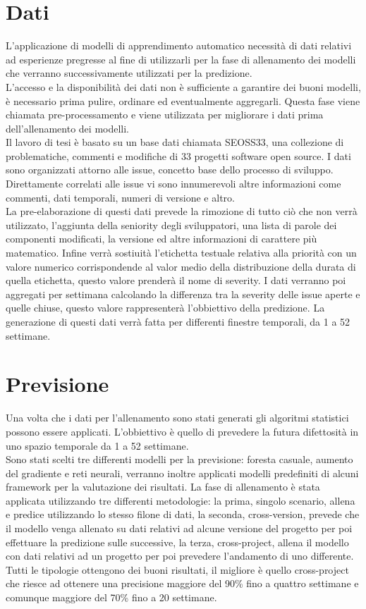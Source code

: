 \documentclass{article}
\begin{document}
\section{Dati}
L'applicazione di modelli di apprendimento automatico necessità di dati relativi ad esperienze pregresse al fine di utilizzarli per la fase di allenamento dei modelli che verranno successivamente utilizzati per la predizione.\\
L'accesso e la disponibilità dei dati non è sufficiente a garantire dei buoni modelli, è necessario prima pulire, ordinare ed eventualmente aggregarli. Questa fase viene chiamata pre-processamento e viene utilizzata per migliorare i dati prima dell'allenamento dei modelli.\\
Il lavoro di tesi è basato su un base dati chiamata SEOSS33, una collezione di problematiche, commenti e modifiche di 33 progetti software open source. I dati sono organizzati attorno alle issue, concetto base dello processo di sviluppo. Direttamente correlati alle issue vi sono innumerevoli altre informazioni come commenti, dati temporali, numeri di versione e altro.\\
La pre-elaborazione di questi dati prevede la rimozione di tutto ciò che non verrà utilizzato, l'aggiunta della seniority degli sviluppatori, una lista di parole dei componenti modificati, la versione ed altre informazioni di carattere più matematico. Infine verrà sostiuità l'etichetta testuale relativa alla priorità con un valore numerico corrispondende al valor medio della distribuzione della durata di quella etichetta, questo valore prenderà il nome di severity. I dati verranno poi aggregati per settimana calcolando la differenza tra la severity delle issue aperte e quelle chiuse, questo valore rappresenterà l'obbiettivo della predizione. La generazione di questi dati verrà fatta per differenti finestre temporali, da 1 a 52 settimane.

\section{Previsione}
Una volta che i dati per l'allenamento sono stati generati gli algoritmi statistici possono essere applicati. L'obbiettivo è quello di prevedere la futura difettosità in uno spazio temporale da 1 a 52 settimane.\\
Sono stati scelti tre differenti modelli per la previsione: foresta casuale, aumento del gradiente e reti neurali, verranno inoltre applicati modelli predefiniti di alcuni framework per la valutazione dei risultati. La fase di allenamento è stata applicata utilizzando tre differenti metodologie: la prima, singolo scenario, allena e predice utilizzando lo stesso filone di dati, la seconda, cross-version, prevede che il modello venga allenato su dati relativi ad alcune versione del progetto per poi effettuare la predizione sulle successive, la terza, cross-project, allena il modello con dati relativi ad un progetto per poi prevedere l'andamento di uno differente.\\
Tutti le tipologie ottengono dei buoni risultati, il migliore è quello cross-project che riesce ad ottenere una precisione maggiore del 90\% fino a quattro settimane e comunque maggiore del 70\% fino a 20 settimane. 
\end{document}
